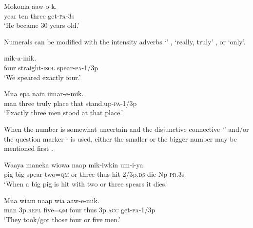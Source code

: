 \ea%
\label{ex:3:x91}
\gll Mokoma   aaw-o-k. \\
year ten three get-\textsc{pa}-3s\\
\glt`He became 30 years old.'
\z

Numerals can be modified with the intensity adverbs   `' ,  `really, truly' , or  `only'.

\ea%
\label{ex:3:x443}
\gll {}  mik-a-mik. \\
four straight-\textsc{isol} spear-\textsc{pa}-1/3p\\
\glt`We speared exactly four.'
\z

\ea%
\label{ex:3:x661}
\gll Mua   epa nain iimar-e-mik. \\
man three truly place that stand.up-\textsc{pa}-1/3p\\
\glt`Exactly three men stood at that place.'
\z

When the number is somewhat uncertain and the disjunctive connective  `' and/or the question marker - is used, either the smaller  or the bigger number  may be mentioned first .

\ea%
\label{ex:3:x1416}
\gll Waaya maneka wiowa    naap mik-iwkin um-i-ya.\\
pig big spear two=\textsc{qm} or three thus hit-2/3p.\textsc{ds} die-Np-\textsc{pr}.3s\\
\glt`When a big pig is hit with two or three spears it dies.'
\z

\ea%
\label{ex:3:x92}
\gll Mua wiam   naap wia aaw-e-mik. \\
man 3p.\textsc{refl} five=\textsc{qm} four thus 3p.\textsc{acc} get-\textsc{pa}-1/3p\\
\glt`They took/got those four or five men.'
\z

